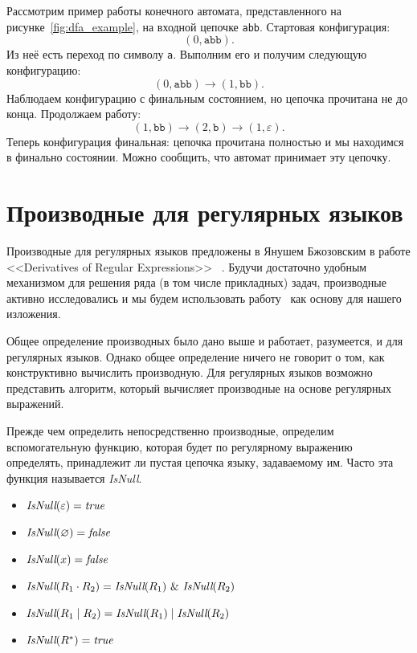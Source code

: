 \begin{example}
    Рассмотрим пример работы конечного автомата, представленного на рисунке~\ref{fig:dfa_example}, на входной цепочке \texttt{abb}.
    Стартовая конфигурация:
    \[
    (0, \texttt{abb}).
    \]
    Из неё есть переход по символу \texttt{a}.
    Выполним его и получим следующую конфигурацию:
    \[
    (0, \texttt{abb}) \to (1, \texttt{bb}).
    \]
    Наблюдаем конфигурацию с финальным состоянием, но цепочка прочитана не до конца.
    Продолжаем работу:
    \[
    (1, \texttt{bb}) \to (2, \texttt{b}) \to (1, \varepsilon).
    \]
    Теперь конфигурация финальная: цепочка прочитана полностью и мы находимся в финально состоянии.
    Можно сообщить, что автомат принимает эту цепочку.
\end{example}


\section{Производные для регулярных языков}

Производные для регулярных языков предложены в Янушем Бжозовским в работе <<Derivatives of Regular Expressions>> ~.
Будучи достаточно удобным механизмом для решения ряда (в том числе прикладных) задач, производные активно исследовались и мы будем использовать работу~ как основу для нашего изложения.

Общее определение производных было дано выше и работает, разумеется, и для регулярных языков.
Однако общее определение ничего не говорит о том, как конструктивно вычислить производную.
Для регулярных языков возможно представить алгоритм, который вычисляет производные на основе регулярных выражений.

Прежде чем определить непосредственно производные, определим вспомогательную функцию, которая будет по регулярному выражению определять, принадлежит ли пустая цепочка языку, задаваемому им.
Часто эта функция называется \emph{IsNull}.

\begin{itemize}
    \item $\emph{IsNull}(\varepsilon) = \emph{true}$
    \item $\emph{IsNull}(\varnothing) = \emph{false}$
    \item $\emph{IsNull}(x) = \emph{false}$
    \item $\emph{IsNull}(R_1 \cdot R_2) = \emph{IsNull}(R_1) \ \& \ \emph{IsNull}(R_2) $
    \item $\emph{IsNull}(R_1 \mid R_2) = \emph{IsNull}(R_1) \mid \emph{IsNull}(R_2) $
    \item $\emph{IsNull}(R^*) = \emph{true}$
\end{itemize}

